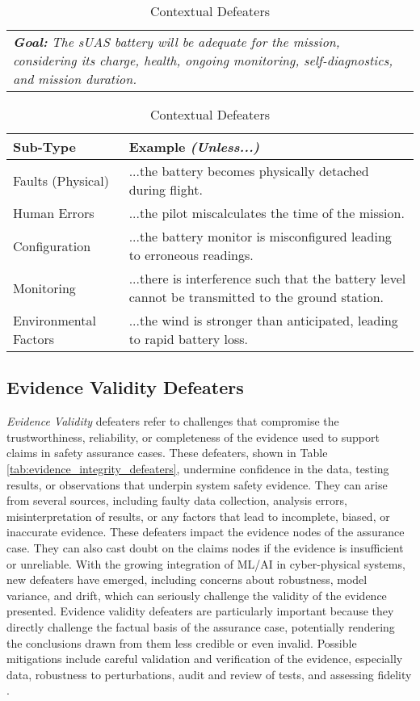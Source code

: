 \begin{table}[h]
\centering
\caption{Contextual Defeaters}
\begin{tabularx}{\linewidth}{@{} X }
\toprule
 \textit{\textbf{Goal:}} \textit{The sUAS battery will be adequate for the mission, considering its charge, health, ongoing monitoring, self-diagnostics, and mission duration.} \\
\end{tabularx}

\begin{tabularx}{\linewidth}{@{} p{1.9cm} X }
\toprule
\textbf{Sub-Type} & \textbf{Example \textit{(Unless...)}} \\
\midrule
Faults (Physical) & ...the battery becomes physically detached during flight. \\
Human Errors & ...the pilot miscalculates the time of the mission.\\
Configuration & ...the battery monitor is misconfigured leading to erroneous readings.\\
Monitoring & ...there is interference such that the battery level cannot be transmitted to the ground station. \\
Environmental Factors & ...the wind is stronger than anticipated, leading to rapid battery loss. \\
\bottomrule
\end{tabularx}
\label{tab:contextual_defeaters}
\end{table}

\subsection{Evidence Validity Defeaters} 

\emph{Evidence Validity} defeaters refer to challenges that compromise the trustworthiness, reliability, or completeness of the evidence used to support claims in safety assurance cases. These defeaters, shown in Table \ref{tab:evidence_integrity_defeaters}, 
undermine confidence in the data, testing results, or observations that underpin system safety evidence. They can arise from several sources, including faulty data collection, analysis errors, misinterpretation of results, or any factors that lead to incomplete, biased, or inaccurate evidence. These defeaters impact the evidence nodes of the assurance case. They can also cast doubt on the claims nodes if the evidence is insufficient or unreliable. 
With the growing integration of ML/AI in cyber-physical systems, new defeaters have emerged, including concerns about robustness, model variance, and drift, which can seriously challenge the validity of the evidence presented. Evidence validity defeaters are particularly important because they directly challenge the factual basis of the assurance case, potentially rendering the conclusions drawn from them less credible or even invalid. Possible mitigations include careful validation and verification of the evidence, especially data, robustness to perturbations, audit and review of tests, and assessing fidelity \cite{bloomfield2021safety}.

